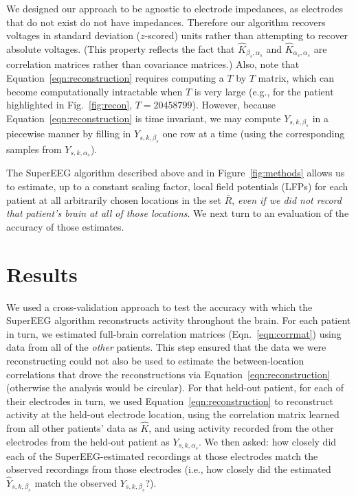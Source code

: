 \message{ !name(main.tex)}\documentclass[11pt]{article}
\begin{document}
We designed our approach to be agnostic to electrode impedances, as
electrodes that do not exist do not have impedances.  Therefore our
algorithm recovers voltages in standard deviation ($z$-scored) units
rather than attempting to recover absolute voltages. (This property
reflects the fact that $\hat{K}_{\beta_s, \alpha_s}$ and
$\hat{K}_{\alpha_s, \alpha_s}$ are correlation matrices rather than
covariance matrices.)  Also, note that
Equation~\ref{eqn:reconstruction} requires computing a $T$ by $T$
matrix, which can become computationally intractable when $T$ is very
large (e.g., for the patient highlighted in Fig.~\ref{fig:recon}, $T =
20458799$). However, because Equation~\ref{eqn:reconstruction} is time
invariant, we may compute $Y_{s,k,\beta_s}$ in a piecewise
manner by filling in $Y_{s,k,\beta_s}$ one row at a time (using the
corresponding samples from $Y_{s, k, \alpha_s}$).

The SuperEEG algorithm described above and in Figure~\ref{fig:methods}
allows us to estimate, up to a constant scaling factor, local field
potentials (LFPs) for each patient at all arbitrarily chosen locations
in the set $\bar{R}$, \textit{even if we did not record that patient's
  brain at all of those locations}.  We next turn to an evaluation of
the accuracy of those estimates.

\section*{Results}
We used a cross-validation approach to test the accuracy with which
the SuperEEG algorithm reconstructs activity throughout the brain.
For each patient in turn, we estimated full-brain correlation matrices
(Eqn.~\ref{eqn:corrmat}) using data from all of the \textit{other}
patients. This step ensured that the data we were reconstructing could
not also be used to estimate the between-location correlations that
drove the reconstructions via Equation~\ref{eqn:reconstruction}
(otherwise the analysis would be circular).  For that held-out
patient, for each of their electrodes in turn, we used
Equation~\ref{eqn:reconstruction} to reconstruct activity at the
held-out electrode location, using the correlation matrix learned from
all other patients' data as $\hat{K}$, and using activity recorded
from the other electrodes from the held-out patient as
$Y_{s, k, \alpha_s}$.  We then asked: how closely did each of the
SuperEEG-estimated recordings at those electrodes match the observed
recordings from those electrodes (i.e., how closely did the estimated
$\hat{Y}_{s, k, \beta_s}$ match the observed $Y_{s, k, \beta_s}$?).
\end{document}
